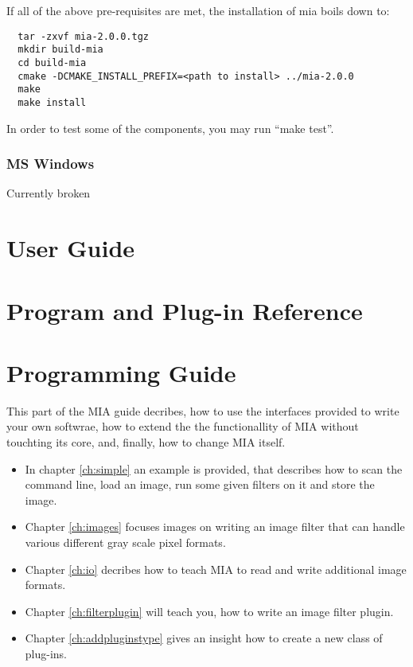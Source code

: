 \documentclass[english, 10pt, a4paper,headsepline,openany]{scrbook}
\begin{document}
If all of the above pre-requisites are met, the installation of mia boils down to:

\lstset{language=bash}
\begin{lstlisting}
  tar -zxvf mia-2.0.0.tgz
  mkdir build-mia
  cd build-mia
  cmake -DCMAKE_INSTALL_PREFIX=<path to install> ../mia-2.0.0
  make
  make install
\end{lstlisting}
In order to test some of the components, you may run ``make test''. 

\subsection{MS Windows} 

Currently broken 

\chapter{User Guide}



\chapter{Program and Plug-in Reference}



\chapter{Programming Guide}
\lstset{numbers=left, numberstyle=\small, numbersep=5pt}

This part of the MIA guide decribes, how to use the interfaces provided to write your own softwrae, 
  how to extend the the functionallity of MIA without touchting its core, and, finally, how to 
  change MIA itself. 
\begin{itemize}
\item In chapter \ref{ch:simple} an example is provided, that describes how to scan the command line, load an image, 
  run some given filters on it and store the image. 
\item Chapter \ref{ch:images} focuses images on writing an image filter that can handle various different gray scale pixel formats.
\item Chapter \ref{ch:io} decribes how to teach MIA to read and write additional image formats. 
\item Chapter \ref{ch:filterplugin} will teach you, how to write an image filter plugin. 
\item Chapter \ref{ch:addpluginstype} gives an insight how to create a new class of plug-ins.
\end{itemize}
\end{document}

